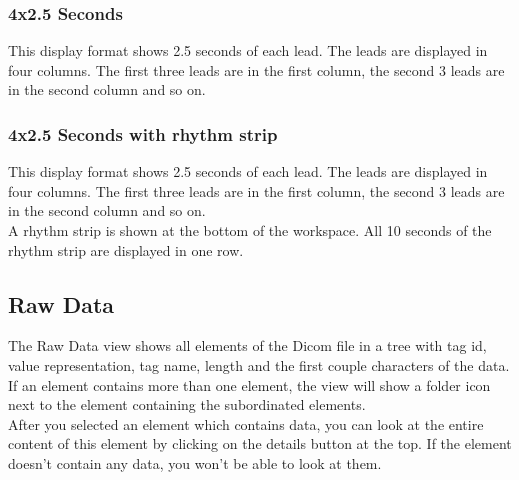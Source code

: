 			\begin{minipage}{\textwidth} 
			\centering
			\label{fig:bild}
			\end{minipage}
		
		\subsubsection{4x2.5 Seconds}
			This display format shows 2.5 seconds of each lead. The leads are displayed
			in four columns. The first three leads are in the first column, the second 3
			leads are in the second column and so on.\\
		
			\begin{minipage}{\textwidth} 
			\centering
			\label{fig:bild}
			\end{minipage}
		
		\subsubsection{4x2.5 Seconds with rhythm strip}
			This display format shows 2.5 seconds of each lead. The leads are displayed
			in four columns. The first three leads are in the first column, the second 3
			leads are in the second column and so on.\\
			A rhythm strip is shown at the bottom of the workspace. All 10 seconds of the rhythm
			strip are displayed in one row. \\
		
			\begin{minipage}{\textwidth} 
			\centering
			\label{fig:bild}
			\end{minipage}

	\subsection{Raw Data}
		The Raw Data view shows all elements of the Dicom file in a tree with tag id, value representation,
		tag name, length and the first couple characters of the data.
		If an element contains more than one element, the view will show a folder icon next to the element 				containing the subordinated elements.\\
		After you selected an element which contains data, you can look at the entire content 							of this element by clicking on the details button at the top. If the element doesn't contain any 				data, you won't be able to look at them.\\
	
